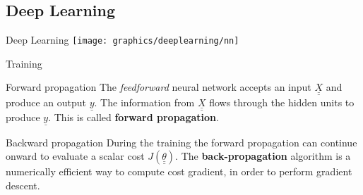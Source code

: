 \subsection{Deep Learning}

    \begin{frame}{Deep Learning}
        \texttt{[image: graphics/deeplearning/nn]}
    \end{frame}

    \begin{frame}{Training}
        \begin{block}{Forward propagation}
            The \emph{feedforward} neural network accepts an input $\underline{\underline{X}}$ and produce an output $\underline{y}$. The information from $\underline{\underline{X}}$ flows through the hidden units to produce $\underline{y}$. This is called \textbf{forward propagation}.
        \end{block}

        \begin{block}{Backward propagation}
            During the training the forward propagation can continue onward to evaluate a scalar cost $J\left(\underline{\underline{\theta}}\right)$. The \textbf{back-propagation} algorithm is a numerically efficient way to compute cost gradient, in order to perform gradient descent.
        \end{block}    
    \end{frame}

